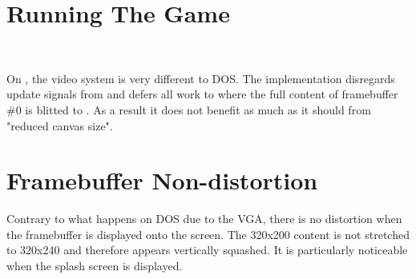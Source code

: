 \section{Running The Game}
\\
\par

On \NeXTns{}, the video system is very different to DOS. The implementation disregards update signals from  and defers all work to  where the full content of framebuffer \#0 is blitted to . As a result it does not benefit as much as it should from "reduced canvas size".\\
\par

\section{Framebuffer Non-distortion}
Contrary to what happens on DOS due to the VGA, there is no distortion when the framebuffer is displayed onto the screen. The 320x200 content is not stretched to 320x240 and therefore appears vertically squashed. It is particularly noticeable when the splash screen is displayed.\\
\par
{}

